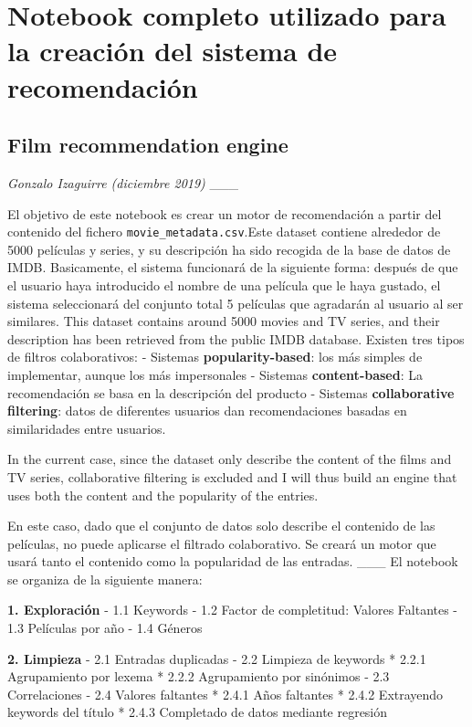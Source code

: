 \chapter{Notebook completo utilizado para la creación del sistema de recomendación}\label{app:notebook}




    \section{\texorpdfstring{\textbf{Film recommendation
engine}}{Film recommendation engine}}\label{film-recommendation-engine}

\emph{Gonzalo Izaguirre (diciembre 2019)} \_\_\_

El objetivo de este notebook es crear un motor de recomendación a partir
del contenido del fichero \texttt{movie\_metadata.csv}.Este dataset
contiene alrededor de 5000 películas y series, y su descripción ha sido
recogida de la base de datos de IMDB. Basicamente, el sistema funcionará
de la siguiente forma: después de que el usuario haya introducido el
nombre de una película que le haya gustado, el sistema seleccionará del
conjunto total 5 películas que agradarán al usuario al ser similares.
This dataset contains around 5000 movies and TV series, and their
description has been retrieved from the public IMDB database. Existen
tres tipos de filtros colaborativos: - Sistemas
\textbf{popularity-based}: los más simples de implementar, aunque los
más impersonales - Sistemas \textbf{content-based}: La recomendación se
basa en la descripción del producto - Sistemas \textbf{collaborative
filtering}: datos de diferentes usuarios dan recomendaciones basadas en
similaridades entre usuarios.

In the current case, since the dataset only describe the content of the
films and TV series, collaborative filtering is excluded and I will thus
build an engine that uses both the content and the popularity of the
entries.

En este caso, dado que el conjunto de datos solo describe el contenido
de las películas, no puede aplicarse el filtrado colaborativo. Se creará
un motor que usará tanto el contenido como la popularidad de las
entradas. \_\_\_ El notebook se organiza de la siguiente manera:

\textbf{1. Exploración} - 1.1 Keywords - 1.2 Factor de completitud:
Valores Faltantes - 1.3 Películas por año - 1.4 Géneros

\textbf{2. Limpieza} - 2.1 Entradas duplicadas - 2.2 Limpieza de
keywords * 2.2.1 Agrupamiento por lexema * 2.2.2 Agrupamiento por
sinónimos - 2.3 Correlaciones - 2.4 Valores faltantes * 2.4.1 Años
faltantes * 2.4.2 Extrayendo keywords del título * 2.4.3 Completado de
datos mediante regresión

